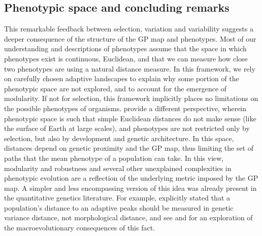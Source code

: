 \begin{refsection}
\section{Phenotypic space and concluding remarks}

This remarkable feedback between selection, variation and variability
suggests a deeper consequence of the structure of the GP map and
phenotypes. Most of our understanding and descriptions of phenotypes
assume that the space in which phenotypes exist is continuous,
Euclidean, and that we can measure how close two phenotypes are using a
natural distance measure. In this framework, we rely on carefully chosen
adaptive landscapes to explain why some portion of the phenotypic space
are not explored, and to account for the emergence of modularity. If not
for selection, this framework implicitly places no limitations on the
possible phenotypes of organisms. \textcite{Stadler2001-vt} provide a different
perspective, wherein phenotypic space is such that simple Euclidean
distances do not make sense (like the surface of Earth at large scales),
and phenotypes are not restricted only by selection, but also by
development and genetic architecture. In this space, distances depend on
genetic proximity and the GP map, thus limiting the set of paths that
the mean phenotype of a population can take. In this view, modularity
and robustness and several other unexplained complexities in phenotypic
evolution are a reflection of the underlying metric imposed by the GP
map. A simpler and less encompassing version of this idea was already
present in the quantitative genetics literature. For example,
\textcite{Lande1979-by} explicitly stated that a population's distance to an
adaptive peaks should be measured in genetic variance distance, not
morphological distance, and see \textcite{Steppan2002-be} and \textcite{Melo2016-yw} for an
exploration of the macroevolutionary consequences of this fact.

\printbibliography
\end{refsection}